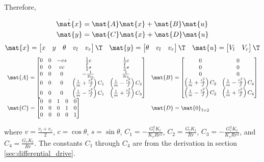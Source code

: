 Therefore,
\begin{theorem}
  \begin{align*}
    \dot{\mat{x}} &= \mat{A}\mat{x} + \mat{B}\mat{u} \\
    \mat{y} &= \mat{C}\mat{x} + \mat{D}\mat{u}
  \end{align*}
  \begin{equation*}
    \mat{x} =
    \begin{bmatrix}
      x & y & \theta & v_l & v_r
    \end{bmatrix}\T
    \quad
    \mat{y} =
    \begin{bmatrix}
      \theta & v_l & v_r
    \end{bmatrix}\T
    \quad
    \mat{u} =
    \begin{bmatrix}
      V_l & V_r
    \end{bmatrix}\T
  \end{equation*}
  \begin{equation}
    \begin{array}{ll}
      \mat{A} =
      \begin{bmatrix}
        0 & 0 & -vs & \frac{1}{2}c & \frac{1}{2}c \\
        0 & 0 & vc & \frac{1}{2}s & \frac{1}{2}s \\
        0 & 0 & 0 & -\frac{1}{2r_b} & \frac{1}{2r_b} \\
        0 & 0 & 0 & \left(\frac{1}{m} + \frac{r_b^2}{J}\right) C_1 &
          \left(\frac{1}{m} - \frac{r_b^2}{J}\right) C_3 \\
        0 & 0 & 0 & \left(\frac{1}{m} - \frac{r_b^2}{J}\right) C_1 &
          \left(\frac{1}{m} + \frac{r_b^2}{J}\right) C_3
      \end{bmatrix} &
      \mat{B} =
      \begin{bmatrix}
        0 & 0 \\
        0 & 0 \\
        0 & 0 \\
        \left(\frac{1}{m} + \frac{r_b^2}{J}\right) C_2 &
        \left(\frac{1}{m} - \frac{r_b^2}{J}\right) C_4 \\
        \left(\frac{1}{m} - \frac{r_b^2}{J}\right) C_2 &
        \left(\frac{1}{m} + \frac{r_b^2}{J}\right) C_4
      \end{bmatrix} \\
      \mat{C} =
      \begin{bmatrix}
        0 & 0 & 1 & 0 & 0 \\
        0 & 0 & 0 & 1 & 0 \\
        0 & 0 & 0 & 0 & 1
      \end{bmatrix} &
      \mat{D} = \mat{0}_{3 \times 2}
    \end{array}
  \end{equation}

  where $v = \frac{v_l + v_r}{2}$, $c = \cos\theta$, $s = \sin\theta$,
  $C_1 = -\frac{G_l^2 K_t}{K_v R r^2}$, $C_2 = \frac{G_l K_t}{Rr}$,
  $C_3 = -\frac{G_r^2 K_t}{K_v R r^2}$, and $C_4 = \frac{G_r K_t}{Rr}$. The
  constants $C_1$ through $C_4$ are from the derivation in section
  \ref{sec:differential_drive}.
\end{theorem}

